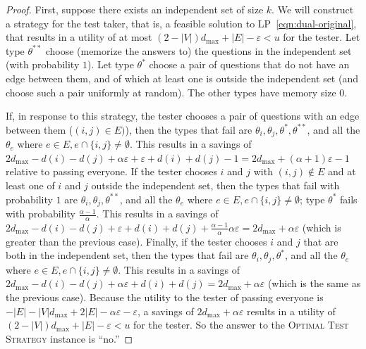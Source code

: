 \documentclass{article}
\begin{document}
\begin{proof}
First, suppose there exists an independent set of size $k$.  We will
construct a strategy for the test taker, that is, a feasible solution to
LP~\ref{eqn:dual-original}, that results in a utility of at most 
$(2-|V|)d_{\text{max}} + |E| - \varepsilon < u$
for the tester.  Let type $\theta^{**}$ choose (memorize the answers to)
the questions in the independent set (with probability $1$).  Let type
$\theta^*$ choose a pair of questions that do not have an edge between
them, and of which at least one is outside the independent set (and choose
such a pair uniformly at random).  The other types have memory size $0$.

If, in response to this strategy, the tester chooses a pair of questions
with an edge between them ($(i,j) \in E)$), then the types that fail are
$\theta_i, \theta_j, \theta^*, \theta^{**}$, and all the $\theta_e$ where
$e \in E, e \cap \{i,j\} \neq \emptyset$.  This results in a savings of
$2d_{\text{max}} - d(i) - d(j) + \alpha \varepsilon + \varepsilon + d(i) +
d(j) - 1 = 2d_{\text{max}} + (\alpha+1) \varepsilon - 1$ relative to
passing everyone.  If the tester chooses $i$ and $j$ with $(i,j) \notin E$
and at least one of $i$ and $j$ outside the independent set, then the types
that fail with probability $1$ are $\theta_i, \theta_j, \theta^{**}$, and
all the $\theta_e$ where $e \in E, e \cap \{i,j\} \neq \emptyset$; type
$\theta^*$ fails with probability $\frac{\alpha-1}{\alpha}$.  This results
in a savings of $2d_{\text{max}} - d(i) - d(j) + \varepsilon + d(i)+d(j) +
\frac{\alpha-1}{\alpha} \alpha \varepsilon = 2d_{\text{max}} + \alpha
\varepsilon$ (which is greater than the previous case).  Finally, if the
tester chooses $i$ and $j$ that are both in the independent set, then the
types that fail are $\theta_i, \theta_j, \theta^*$, and all the $\theta_e$
where $e \in E, e \cap \{i,j\} \neq \emptyset$.  This results in a savings
of $2d_{\text{max}} - d(i) - d(j) + \alpha \varepsilon + d(i) + d(j) =
2d_{\text{max}} + \alpha \varepsilon$ (which is the same as the previous
case).  Because the utility to the tester of passing everyone is $-|E| -
|V|d_{\text{max}} + 2|E| - \alpha \varepsilon - \varepsilon$, a savings of
$2d_{\text{max}} + \alpha \varepsilon$ results in a utility of
$(2-|V|)d_{\text{max}} + |E| - \varepsilon < u$ for the tester.  So the
answer to the \textsc{Optimal Test Strategy} instance is ``no.''



\end{proof}
\end{document}
